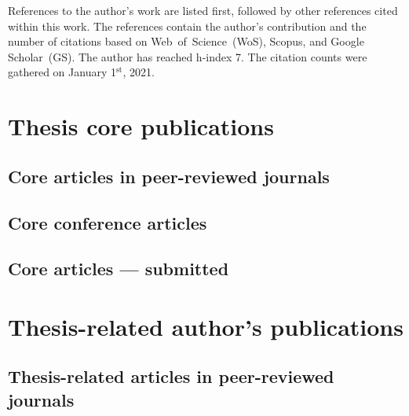 \documentclass[a4paper,11pt,twoside,openright]{book}
\begin{document}
References to the author's work are listed first, followed by other references cited within this work.
The references contain the author's contribution and the number of citations based on Web~of~Science~(WoS), Scopus, and Google Scholar~(GS).
The author has reached h-index 7.
The citation counts were gathered on January 1$^{\text{st}}$, 2021.


\section{Thesis core publications}

\subsection*{Core articles in peer-reviewed journals}
\printbibliography[keyword={mine},keyword={phd_related},keyword={journal},keyword={core},notkeyword={submitted},heading=none,title={}]

\subsection*{Core conference articles}
\printbibliography[keyword={mine},keyword={phd_related},keyword={conference},keyword={core},notkeyword={submitted},heading=none,title={}]

\subsection*{Core articles --- submitted}
\printbibliography[keyword={mine},keyword={phd_related},keyword={submitted},keyword={core},heading=none,title={}]



\section{Thesis-related author's publications}

\subsection*{Thesis-related articles in peer-reviewed journals}
\printbibliography[keyword={mine},keyword={phd_related},keyword={journal},notkeyword={core},notkeyword={submitted},heading=none,title={}]

\end{document}
